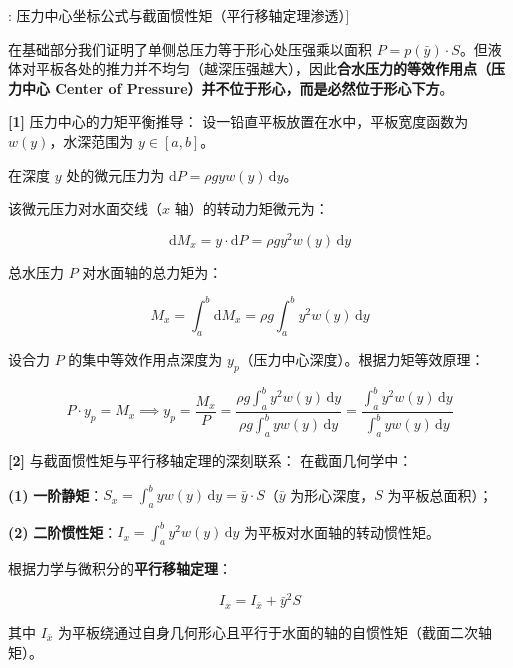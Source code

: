 \documentclass[11pt,a4paper,UTF8]{ctexart}
\begin{document}
\begin{thmbox}[模型[5]: 压力中心坐标公式与截面惯性矩（平行移轴定理渗透）]

在基础部分我们证明了单侧总压力等于形心处压强乘以面积 $P = p(\bar{y}) \cdot S$。但液体对平板各处的推力并不均匀（越深压强越大），因此\textbf{合水压力的等效作用点（压力中心 Center of Pressure）并不位于形心，而是必然位于形心下方}。

\textbf{[1]} 压力中心的力矩平衡推导：
设一铅直平板放置在水中，平板宽度函数为 $w(y)$，水深范围为 $y \in [a, b]$。

在深度 $y$ 处的微元压力为 $\mathrm{d}P = \rho g y w(y)\,\mathrm{d}y$。

该微元压力对水面交线（$x$ 轴）的转动力矩微元为：


\begin{equation*}
\mathrm{d}M_x = y \cdot \mathrm{d}P = \rho g y^2 w(y)\,\mathrm{d}y
\end{equation*}


总水压力 $P$ 对水面轴的总力矩为：


\begin{equation*}
M_x = \int_a^b \mathrm{d}M_x = \rho g \int_a^b y^2 w(y)\,\mathrm{d}y
\end{equation*}


设合力 $P$ 的集中等效作用点深度为 $y_p$（压力中心深度）。根据力矩等效原理：


\begin{equation*}
P \cdot y_p = M_x \implies y_p = \frac{M_x}{P} = \frac{\rho g \int_a^b y^2 w(y)\,\mathrm{d}y}{\rho g \int_a^b y w(y)\,\mathrm{d}y} = \frac{\int_a^b y^2 w(y)\,\mathrm{d}y}{\int_a^b y w(y)\,\mathrm{d}y}
\end{equation*}


\textbf{[2]} 与截面惯性矩与平行移轴定理的深刻联系：
在截面几何学中：

\textbf{(1)}  \textbf{一阶静矩}：$S_x = \int_a^b y w(y)\,\mathrm{d}y = \bar{y} \cdot S$（$\bar{y}$ 为形心深度，$S$ 为平板总面积）；

\textbf{(2)}  \textbf{二阶惯性矩}：$I_x = \int_a^b y^2 w(y)\,\mathrm{d}y$ 为平板对水面轴的转动惯性矩。

根据力学与微积分的\textbf{平行移轴定理}：


\begin{equation*}
I_x = I_{\bar{x}} + \bar{y}^2 S
\end{equation*}


其中 $I_{\bar{x}}$ 为平板绕通过自身几何形心且平行于水面的轴的自惯性矩（截面二次轴矩）。


\end{thmbox}
\end{document}

